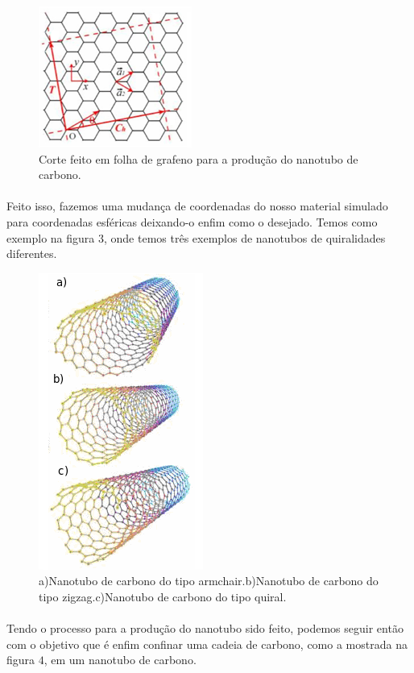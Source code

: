 \documentclass[12pt,a4paper]{report}
\begin{document}
\begin{figure} [!h]
\centering
\includegraphics[scale=1.0]{corte2.png}
\caption{Corte feito em folha de grafeno para a produção do nanotubo de carbono.}
\end{figure}

\paragraph{}
Feito isso, fazemos uma mudança de coordenadas do nosso material simulado para coordenadas esféricas deixando-o enfim como o desejado. Temos como exemplo na figura $3$, onde temos três exemplos de nanotubos de quiralidades diferentes. 

\begin{figure} [!h]
\centering
\includegraphics[scale=0.6]{cntclass.png}
\caption{a)Nanotubo de carbono do tipo armchair.b)Nanotubo de carbono do tipo zigzag.c)Nanotubo de carbono do tipo quiral.}
\end{figure}

\paragraph{}
Tendo o processo para a produção do nanotubo sido feito, podemos seguir então com o objetivo que é enfim confinar uma cadeia de carbono, como a mostrada na figura $4$, em um nanotubo de carbono.
\end{document}
